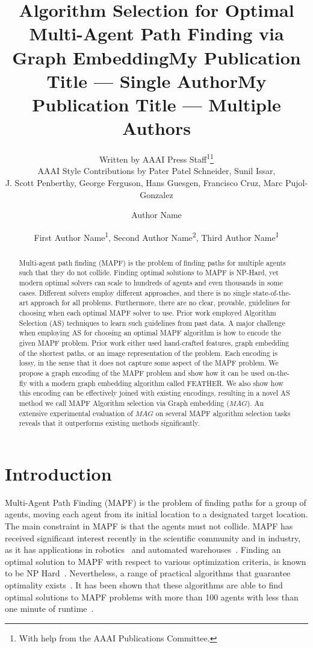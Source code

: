 \documentclass[letterpaper]{article} %
\title{Algorithm Selection for Optimal Multi-Agent Path Finding via Graph Embedding}
\author{
    Written by AAAI Press Staff\textsuperscript{\rm 1}\thanks{With help from the AAAI Publications Committee.}\\
    AAAI Style Contributions by Pater Patel Schneider,
    Sunil Issar,\\
    J. Scott Penberthy,
    George Ferguson,
    Hans Guesgen,
    Francisco Cruz\equalcontrib,
    Marc Pujol-Gonzalez\equalcontrib
}
\title{My Publication Title --- Single Author}
\author {
    Author Name
}
\title{My Publication Title --- Multiple Authors}
\author {
    First Author Name\textsuperscript{\rm 1},
    Second Author Name\textsuperscript{\rm 2},
    Third Author Name\textsuperscript{\rm 1}
}
\newcommand{\mapfgas}[1]{\ensuremath{\textit{MAG}}\xspace}
\begin{document}
\maketitle

\begin{abstract}
Multi-agent path finding (MAPF) is the problem of finding paths for multiple agents such that they do not collide. 
Finding optimal solutions to MAPF is NP-Hard, yet modern optimal solvers can scale to hundreds of agents and even thousands in some cases. 
Different solvers employ different approaches, and there is no single state-of-the-art approach for all problems. 
Furthermore, there are no clear, provable, guidelines for choosing when each optimal MAPF solver to use. 
Prior work employed Algorithm Selection (AS) techniques to learn such guidelines from past data. 
A major challenge when employing AS for choosing an optimal MAPF algorithm is how to encode the given MAPF problem. 
Prior work either used hand-crafted features, graph embedding of the shortest paths, or an image representation of the problem. Each encoding is lossy, in the sense that it does not capture some aspect of the MAPF problem. 
We propose a graph encoding of the MAPF problem and show how it can be used on-the-fly with a modern graph embedding algorithm called FEATHER. 
We also show how this encoding can be effectively joined with existing encodings, resulting in a novel AS method we call MAPF Algorithm selection via Graph embedding (\mapfgas\ ). An extensive experimental evaluation of \mapfgas\ on several MAPF algorithm selection tasks reveals that it outperforms existing methods significantly. 
\end{abstract}

\section{Introduction}
\label{scn:Intro}

Multi-Agent Path Finding (MAPF) is the problem of finding paths for a group of agents, moving each agent from its initial location to a designated target location. 
The main constraint in MAPF is that the agents must not collide. 
MAPF has received significant interest recently in the scientific community and in industry, as it has applications in robotics~\cite{veloso2015cobots} and automated warehouses~\cite{wurman2008coordinating}. 
Finding an optimal solution to MAPF with respect to various optimization criteria, is known to be NP Hard~\cite{anOptimization2010surynek,structure2013yu}. 
Nevertheless, a range of practical algorithms that guarantee optimality exists~\cite{kornhauser1984pebble,surynek2009novel}. 
It has been shown that these algorithms are able to find optimal solutions to MAPF problems with more than 100 agents with less than one minute of runtime~\cite{li2021pairwise}. 
\end{document}
